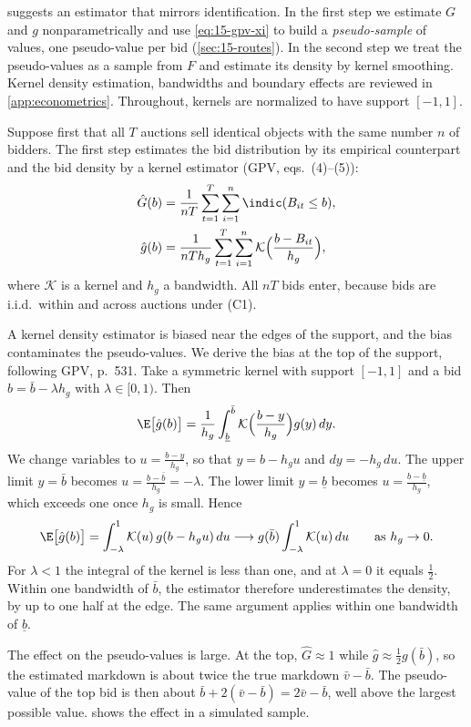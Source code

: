 suggests an estimator that mirrors identification. In the first step we estimate $G$ and $g$ nonparametrically and use \eqref{eq:15-gpv-xi} to build a \emph{pseudo-sample} of values, one pseudo-value per bid (\cref{sec:15-routes}). In the second step we treat the pseudo-values as a sample from $F$ and estimate its density by kernel smoothing. Kernel density estimation, bandwidths and boundary effects are reviewed in \cref{app:econometrics}. Throughout, kernels are normalized to have support $[-1,1]$.

 Suppose first that all $T$ auctions sell identical objects with the same number $n$ of bidders. The first step estimates the bid distribution by its empirical counterpart and the bid density by a kernel estimator (GPV, eqs.~(4)--(5)):
\begin{align}
\hat G(b)&=\frac{1}{nT}\sum_{t=1}^T\sum_{i=1}^n\indic(B_{it}\le b),\label{eq:15-gpv-Ghat}\\
\hat g(b)&=\frac{1}{nTh_g}\sum_{t=1}^T\sum_{i=1}^n\mathcal K\Big(\frac{b-B_{it}}{h_g}\Big),\label{eq:15-gpv-ghat}
\end{align}
where $\mathcal K$ is a kernel and $h_g$ a bandwidth. All $nT$ bids enter, because bids are i.i.d.\ within and across auctions under (C1).

 A kernel density estimator is biased near the edges of the support, and the bias contaminates the pseudo-values. We derive the bias at the top of the support, following GPV, p.~531. Take a symmetric kernel with support $[-1,1]$ and a bid $b=\bar b-\lambda h_g$ with $\lambda\in[0,1)$. Then
\[
\E\big[\hat g(b)\big]=\frac{1}{h_g}\int_{\underline b}^{\bar b}\mathcal K\Big(\frac{b-y}{h_g}\Big)g(y)\,dy.
\]
We change variables to $u=\frac{b-y}{h_g}$, so that $y=b-h_gu$ and $dy=-h_g\,du$. The upper limit $y=\bar b$ becomes $u=\frac{b-\bar b}{h_g}=-\lambda$. The lower limit $y=\underline b$ becomes $u=\frac{b-\underline b}{h_g}$, which exceeds one once $h_g$ is small. Hence
\[
\E\big[\hat g(b)\big]=\int_{-\lambda}^{1}\mathcal K(u)\,g(b-h_gu)\,du\longrightarrow g(\bar b)\int_{-\lambda}^{1}\mathcal K(u)\,du\qquad\text{as }h_g\to0.
\]
For $\lambda<1$ the integral of the kernel is less than one, and at $\lambda=0$ it equals $\frac12$. Within one bandwidth of $\bar b$, the estimator therefore underestimates the density, by up to one half at the edge. The same argument applies within one bandwidth of $\underline b$.

The effect on the pseudo-values is large. At the top, $\hat G\approx1$ while $\hat g\approx\frac12g(\bar b)$, so the estimated markdown is about twice the true markdown $\bar v-\bar b$. The pseudo-value of the top bid is then about $\bar b+2(\bar v-\bar b)=2\bar v-\bar b$, well above the largest possible value.  shows the effect in a simulated sample.

